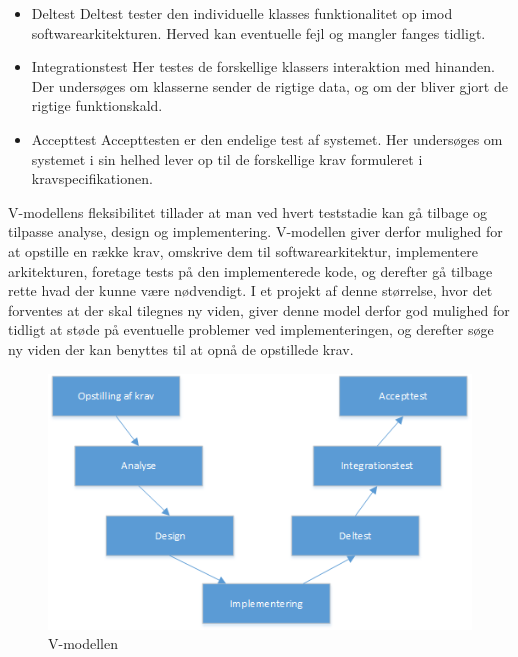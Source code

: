 \documentclass[rapport.tex]{subfiles}
\begin{document}
	\begin{itemize}
		\item Deltest
		\subitem Deltest tester den individuelle klasses funktionalitet op imod softwarearkitekturen. Herved kan eventuelle fejl og mangler fanges tidligt. 
		\item Integrationstest
		\subitem Her testes de forskellige klassers interaktion med hinanden. Der undersøges om klasserne sender de rigtige data, og om der bliver gjort de rigtige funktionskald. 
		\item Accepttest
		\subitem Accepttesten er den endelige test af systemet. Her undersøges om systemet i sin helhed lever op til de forskellige krav formuleret i kravspecifikationen. \\
		
	\end{itemize}
	
	
	V-modellens fleksibilitet tillader at man ved hvert teststadie kan gå tilbage og tilpasse analyse, design og implementering. 
	V-modellen giver derfor mulighed for at opstille en række krav, omskrive dem til softwarearkitektur, implementere arkitekturen, foretage tests på den implementerede kode, og derefter gå tilbage rette hvad der kunne være nødvendigt. 
	I et projekt af denne størrelse, hvor det forventes at der skal tilegnes ny viden, giver denne model derfor god mulighed for tidligt at støde på eventuelle problemer ved implementeringen, og derefter søge ny viden der kan benyttes til at opnå de opstillede krav. 
	
	\begin{figure}[H]
		\centering
		\includegraphics[width=0.9\linewidth]{Vmodel}
		\caption[V-modellen]{V-modellen}
		\label{fig:Vmodel}
	\end{figure}
	
\end{document}
